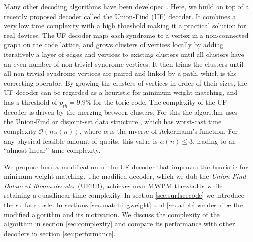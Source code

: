 Many other decoding algorithms have been developed \cites{duclos2013fault, hutter2015improved, watson2015fast, tuckett2018ultrahigh, kubica2019cellular, torlai2017neural, varsamopoulos2017decoding}. Here, we build on top of a recently proposed decoder called the Union-Find (UF) decoder. It combines a very low time complexity with a high threshold \cite{delfosse2017linear, delfosse2017almost} making it a practical solution for real devices. 
The UF decoder maps each syndrome to a vertex in a non-connected graph on the code lattice, and grows clusters of vertices locally by adding iteratively a layer of edges and vertices to existing clusters until all clusters have an even number of non-trivial syndrome vertices. It then trims the clusters until all non-trivial syndrome vertices are paired and linked by a path, which is the correcting operator. By growing the clusters of vertices in order of their sizes, the UF-decoder can be regarded as a heuristic for minimum-weight matching, and has a threshold of $p_{th} = 9.9\%$ for the toric code. The complexity of the UF decoder is driven by the merging between clusters. For this the algorithm uses the Union-Find or disjoint-set data structure \cite{tarjan1975efficiency}, which has worst-cast time complexity $\mathcal{O}(n\alpha(n))$, where $\alpha$ is the inverse of Ackermann's function. For any physical feasible amount of qubits, this value is $\alpha(n) \leq 3$, leading to an ``almost-linear'' time complexity.

We propose here a modification of the UF decoder that improves the heuristic for minimum-weight matching. The modified decoder, which we dub the \emph{Union-Find Balanced Bloom decoder} (UFBB), achieves near MWPM thresholds while retaining a quasilinear time complexity. In section \ref{sec:surfacecode} we introduce the surface code. In sections \ref{sec:matchingweight} and \ref{sec:ufbb} we describe the modified algorithm and its motivation. We discuss the complexity of the algorithm in section \ref{sec:complexity} and compare its performance with other decoders in section \ref{sec:performance}.  